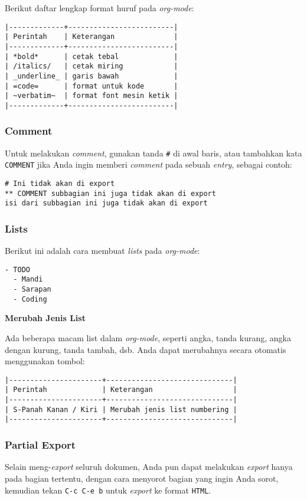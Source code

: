 \documentclass{article}
\begin{document}
Berikut daftar lengkap format huruf pada \emph{org-mode}:

\begin{verbatim}
|-------------+-------------------------|
| Perintah    | Keterangan              |
|-------------+-------------------------|
| *bold*      | cetak tebal             |
| /italics/   | cetak miring            |
| _underline_ | garis bawah             |
| =code=      | format untuk kode       |
| ~verbatim~  | format font mesin ketik |
|-------------+-------------------------|
\end{verbatim}

\subsubsection{Comment}
Untuk melakukan \emph{comment}, gunakan tanda \verb=#= di awal baris, atau
tambahkan kata \verb=COMMENT= jika Anda ingin memberi \emph{comment} pada
sebuah \emph{entry}, sebagai contoh:

\begin{verbatim}
# Ini tidak akan di export
** COMMENT subbagian ini juga tidak akan di export
isi dari subbagian ini juga tidak akan di export
\end{verbatim}

\subsubsection{Lists}
Berikut ini adalah cara membuat \emph{lists} pada \emph{org-mode}:

\begin{verbatim}
- TODO
  - Mandi
  - Sarapan
  - Coding
\end{verbatim}

\noindent\textbf{Merubah Jenis List}

Ada beberapa macam list dalam \emph{org-mode}, seperti angka, tanda kurang,
angka dengan kurung, tanda tambah, dsb. Anda dapat merubahnya secara 
otomatis menggunakan tombol:

\begin{verbatim}
|----------------------+------------------------------|
| Perintah             | Keterangan                   |
|----------------------+------------------------------|
| S-Panah Kanan / Kiri | Merubah jenis list numbering |
|----------------------+------------------------------|
\end{verbatim}

\subsubsection{Partial Export}
Selain meng-\emph{export} seluruh dokumen, Anda pun dapat melakukan 
\emph{export} hanya pada bagian tertentu, dengan cara menyorot bagian yang 
ingin Anda sorot, kemudian tekan \verb=C-c C-e b= untuk \emph{export} ke 
format \verb=HTML=.
\end{document}
